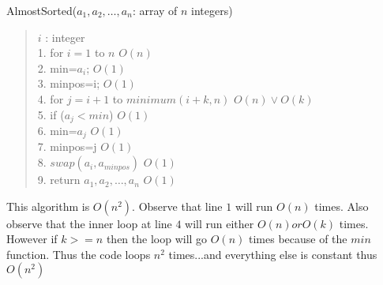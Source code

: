\documentclass[12pt]{article}
\begin{document}
\begin{enumerate}
\begin{enumerate}
AlmostSorted($a_1,a_2, \ldots , a_n$: array of $n$ integers)
\begin{quote}
$i$ : integer \\
1.	\hspace{0.1in}	for $i=1$ to $n$ $O(n)$\\
2.	\hspace{0.3in}		min=$a_i$; $O(1)$\\
3.	\hspace{0.3in}		minpos=i; $O(1)$\\
4.	\hspace{0.3in}		for $j=i+1$ to $minimum(i+k,n)$ $O(n)
\vee O(k)$\\
5.	\hspace{0.5in}			if ($a_j < min$) $O(1)$\\
6.	\hspace{0.7in}				min=$a_j$ $O(1)$\\
7.	\hspace{0.7in}				minpos=j $O(1)$\\
8.	\hspace{0.3in}		$swap(a_i,a_{minpos})$ $O(1)$\\
9.	\hspace{0.1in}	return $a_1,a_2, \ldots , a_n$ $O(1)$
\end{quote}

This algorithm is $O(n^2)$. Observe that line $1$ will run $O(n)$
times. Also observe that the inner loop at line $4$ will run either
$O(n) or O(k)$ times. However if $k >= n$ then the loop will go $O(n)$
times because of the $min$ function. Thus the code loops $n^2$
times...and everything else is constant thus $O(n^2)$

\end{enumerate}


\end{enumerate}
\end{document}
